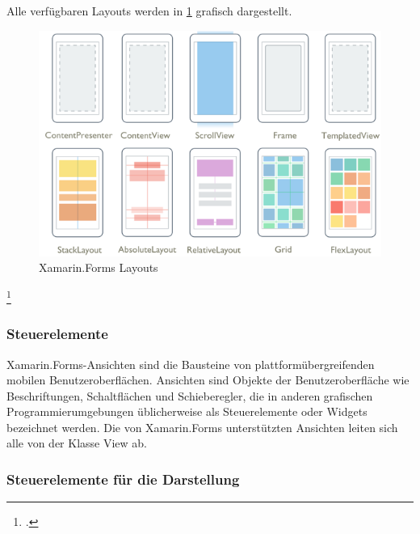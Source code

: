 Alle verfügbaren Layouts werden in  \ref{fig:Xamarin.Forms Layouts} grafisch dargestellt.

\begin{figure}[h]
 \includegraphics[width=\textwidth,height=\textheight,keepaspectratio]{Images/CrossPlattformFrameworks/XamarinFormsLayouts.png}
 \caption[Xamarin.Forms Layouts]{Xamarin.Forms Layouts\footnotemark}
 \label{fig:Xamarin.Forms Layouts}
\end{figure}
\footcitetext[Abbildung in Anlehnung an ][Abgerufen am \today]{MicrosoftXamLayouts2018}


\subsubsection{Steuerelemente}

Xamarin.Forms-Ansichten sind die Bausteine von plattformübergreifenden mobilen Benutzeroberflächen. Ansichten sind Objekte der Benutzeroberfläche wie Beschriftungen, Schaltflächen und Schieberegler, die in anderen grafischen Programmierumgebungen üblicherweise als Steuerelemente oder Widgets bezeichnet werden. Die von Xamarin.Forms unterstützten Ansichten leiten sich alle von der Klasse View ab. 
\subsubsection{Steuerelemente für die Darstellung}

